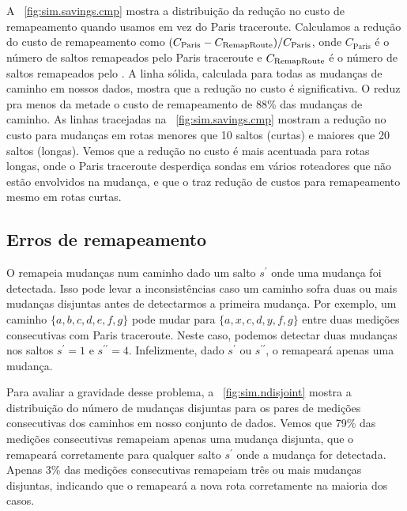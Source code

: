 A \figstr~\ref{fig:sim.savings.cmp} mostra a distribuição da redução no
custo de remapeamento quando usamos \rmprt{} em vez do Paris traceroute.
Calculamos a redução do custo de remapeamento como $(C_\mathrm{Paris} -
C_\mathrm{{Re\-map\-Rou\-te}})/C_\mathrm{Paris}$, onde $C_\mathrm{Paris}$ é o número
de saltos remapeados pelo Paris traceroute e $C_\mathrm{{Re\-map\-Rou\-te}}$ é o
número de saltos remapeados pelo \rmprt{}.  A linha sólida, calculada
para todas as mudanças de caminho em nossos dados, mostra que a redução
no custo é significativa.  O \rmprt{} reduz pra menos da metade o custo
de remapeamento de 88\% das mudanças de caminho.  As linhas tracejadas
na \figstr~\ref{fig:sim.savings.cmp} mostram a redução no custo para
mudanças em rotas menores que 10 saltos (curtas) e maiores que 20 saltos
(longas).  Vemos que a redução no custo é mais acentuada para rotas
longas, onde o Paris traceroute desperdiça sondas em vários roteadores
que não estão envolvidos na mudança, e que o \rmprt{} traz redução de
custos para remapeamento mesmo em rotas curtas.

\subsection{Erros de remapeamento}

O \rmprt{} remapeia mudanças num caminho dado um salto $s^\prime$ onde
uma mudança foi detectada.  Isso pode levar a inconsistências caso um
caminho sofra duas ou mais mudanças disjuntas antes de detectarmos a
primeira mudança.  Por exemplo, um caminho $\{a, b, c, d, e, f, g\}$
pode mudar para $\{a, x, c, d, y, f, g\}$ entre duas medições
consecutivas com Paris traceroute.  Neste caso, podemos detectar duas
mudanças nos saltos $s^\prime = 1$ e $s^{\prime\prime} = 4$.
Infelizmente, dado $s^\prime$ ou $s^{\prime\prime}$, o \rmprt{}
remapeará apenas uma mudança.

Para avaliar a gravidade desse problema, a
\figstr~\ref{fig:sim.ndisjoint} mostra a distribuição do número de
mudanças disjuntas para os pares de medições consecutivas dos caminhos
em nosso conjunto de dados.\footnotemark{}  Vemos que 79\% das medições
consecutivas remapeiam apenas uma mudança disjunta, que o \rmprt{}
remapeará corretamente para qualquer salto $s^\prime$ onde a mudança for
detectada.  Apenas 3\% das medições consecutivas remapeiam três ou mais
mudanças disjuntas, indicando que o \rmprt{} remapeará a nova rota
corretamente na maioria dos casos.



